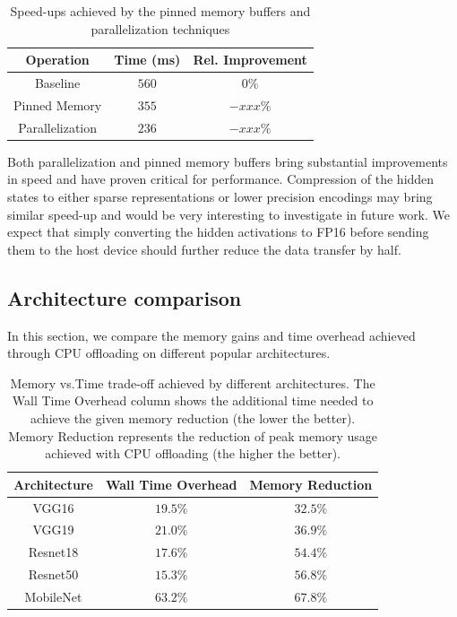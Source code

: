\documentclass[11pt,onecolumn]{article}
\begin{document}
\begin{table}[h]
\begin{center}
\begin{tabular}{ c c c}	
\hline
Operation                   & Time (ms)  & Rel. Improvement\\
\hline
Baseline                    &  $560$    & $0\%$      \\
Pinned Memory               &  $355$    & $-xxx\%$ \\
Parallelization             &  $236$    & $-xxx\%$ \\
\hline
\end{tabular}
\caption{Speed-ups achieved by the pinned memory buffers and parallelization techniques}
\end{center}
\end{table}

Both parallelization and pinned memory buffers bring substantial improvements 
in speed and have proven critical for performance.
Compression of the hidden states to either sparse representations or lower precision
encodings may bring similar speed-up and would be very interesting to investigate in future work. 	
We expect that simply converting the hidden activations to FP16 before sending them
to the host device should further reduce the data transfer by half.

\subsection{Architecture comparison}

In this section, we compare the memory gains and time overhead 
achieved through CPU offloading on different popular architectures.

\begin{table}[h]
\begin{center}
\begin{tabular}{ c c c}	
\hline
Architecture            & Wall Time Overhead & Memory Reduction    \\
\hline
VGG16                   &  $19.5\%$            & $32.5\%$          \\
VGG19                   &  $21.0\%$            & $36.9\%$          \\
Resnet18       	        &  $17.6\%$            & $54.4\%$          \\
Resnet50                &  $15.3\%$            & $56.8\%$          \\
MobileNet               &  $63.2\%$            & $67.8\%$          \\
\hline
\end{tabular}
\caption{Memory vs.Time trade-off achieved by different architectures.
The Wall Time Overhead column shows the additional time needed to achieve the given memory reduction (the lower the better).
Memory Reduction represents the reduction of peak memory usage achieved with CPU offloading (the higher the better).}
\end{center}
\end{table}
\end{document}
